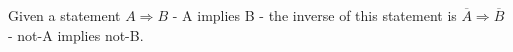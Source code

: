 \newcommand{\implies}{\Rightarrow}
Given a statement $ A \implies B  $ - A implies B - the inverse of this statement is $ \overline{A} \implies \overline{B}$ - not-A implies not-B.